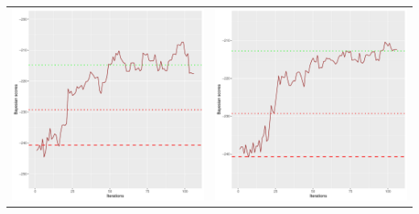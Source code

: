 \documentclass[]{scrartcl}
\begin{document}
\begin{table}[h!]
\begin{tabular}{cc}
\includegraphics[scale = 0.4]{./figs/asia/v3/10/bayBoundsEvolution-107.pdf} & 
\includegraphics[scale = 0.4]{./figs/asia/v3/20/bayBoundsEvolution-107.pdf} \\

\end{tabular}
\end{table}
\end{document}
